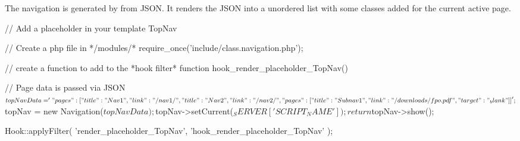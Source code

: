 The navigation is generated by from J\-S\-O\-N. It renders the J\-S\-O\-N into a unordered list with some classes added for the current active page. \begin{DoxyVerb}// Add a placeholder in your template
{{ TopNav }}

// Create a php file in */modules/*
require_once('include/class.navigation.php');

// create a function to add to the *hook filter*
function hook_render_placeholder_TopNav() {

    // Page data is passed via JSON
    $topNavData = '{
        "pages": [
            {
                "title": "Nav 1",
                "link": "/nav1/"
            }, {
                "title": "Nav 2",
                "link": "/nav2/",
                "pages": [
                    {
                        "title": "Subnav 1",
                        "link": "/downloads/fpo.pdf",
                        "target": "_blank"
                    }
                ]
            }
        ]
    }';

    $topNav = new Navigation($topNavData);
    $topNav->setCurrent($_SERVER['SCRIPT_NAME']);

    return $topNav->show();
}

Hook::applyFilter(
    'render_placeholder_TopNav',
    'hook_render_placeholder_TopNav'
);\end{DoxyVerb}
 